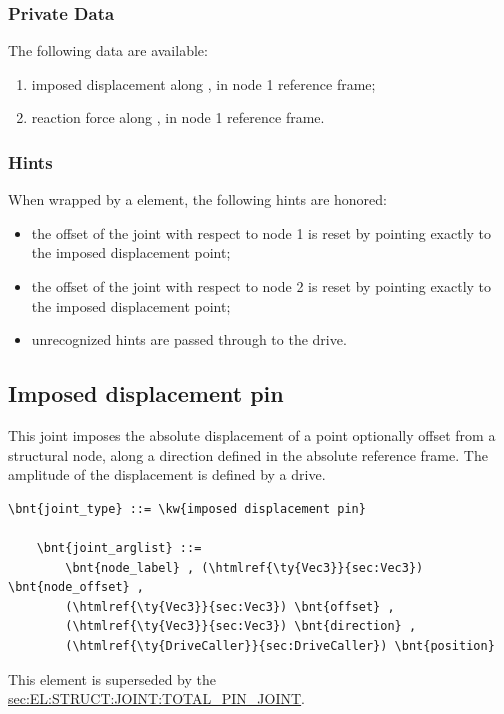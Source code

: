 \subsubsection{Private Data}
The following data are available:
\begin{enumerate}
\item {} imposed displacement along ,
in node 1 reference frame;
\item {} reaction force along ,
in node 1 reference frame.
\end{enumerate}

\subsubsection{Hints}
When wrapped by a  element, the following hints are honored:
\begin{itemize}
\item {} the offset of the joint
with respect to node 1 is reset by pointing exactly
to the imposed displacement point;
\item {} the offset of the joint
with respect to node 2 is reset by pointing exactly
to the imposed displacement point;
\item unrecognized hints are passed through to the drive.
\end{itemize}



\subsection{Imposed displacement pin}
\label{sec:EL:JOINT:IMPOSEDDISPLACEMENTPIN}
This joint imposes the absolute displacement of a point optionally offset
from a structural node, along a direction defined
in the absolute reference frame.
The amplitude of the displacement is defined by a drive.
\begin{Verbatim}[commandchars=\\\{\}]
    \bnt{joint_type} ::= \kw{imposed displacement pin}

    \bnt{joint_arglist} ::= 
        \bnt{node_label} , (\htmlref{\ty{Vec3}}{sec:Vec3}) \bnt{node_offset} ,
        (\htmlref{\ty{Vec3}}{sec:Vec3}) \bnt{offset} ,
        (\htmlref{\ty{Vec3}}{sec:Vec3}) \bnt{direction} ,
        (\htmlref{\ty{DriveCaller}}{sec:DriveCaller}) \bnt{position}
\end{Verbatim}
This element is superseded by the
\hyperref{\kw{total pin joint}}{\kw{total pin joint}, see Section~}{}{sec:EL:STRUCT:JOINT:TOTAL_PIN_JOINT}.

